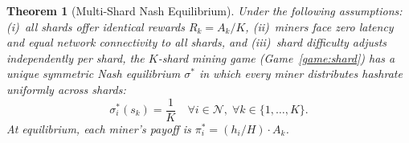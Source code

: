 \documentclass[11pt,a4paper]{article}
\newtheorem{theorem}{Theorem}[section]
\theoremstyle{definition}
\theoremstyle{remark}
\newcommand{\payoff}{\pi}
\newcommand{\strategy}{\sigma}
\newcommand{\Players}{\mathcal{N}}
\newcommand{\hashrate}{h}
\newcommand{\Hashrate}{H}
\newcommand{\reward}{R}
\begin{document}
\begin{theorem}[Multi-Shard Nash Equilibrium]\label{thm:nash-shard}
Under the following assumptions: (i)~all shards offer identical rewards
$\reward_k = A_k/K$, (ii)~miners face zero latency and equal
network connectivity to all shards, and (iii)~shard difficulty adjusts
independently per shard, the $K$-shard mining game
(Game~\ref{game:shard}) has a unique symmetric Nash equilibrium
$\strategy^*$ in which every miner distributes hashrate uniformly
across shards:
\begin{equation}\label{eq:nash}
  \strategy_i^*(s_k) = \frac{1}{K} \quad \forall i \in \Players,
  \; \forall k \in \{1, \ldots, K\}.
\end{equation}
At equilibrium, each miner's payoff is
$\payoff_i^* = (\hashrate_i / \Hashrate) \cdot A_k$.
\end{theorem}
\end{document}
